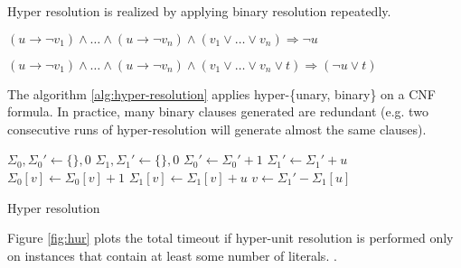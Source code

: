 \label{sec:hyper-binary-resolution}

Hyper resolution is realized by applying binary resolution repeatedly.


\begin{myprop}
  $(u \rightarrow \neg v_1) \land \ldots
  \land (u \rightarrow \neg v_n) \land (v_1 \lor \dots \lor v_n)
  \Rightarrow \neg u$
\end{myprop}

\begin{myprop}
  $(u \rightarrow \neg v_1) \land \ldots
  \land (u \rightarrow \neg v_n)
  \land (v_1 \lor \dots \lor v_n \lor t) \Rightarrow (\neg u \lor t)$
\end{myprop}

The algorithm \ref{alg:hyper-resolution} applies hyper-\{unary,
binary\} on a CNF formula. In practice, many binary clauses generated
are redundant (e.g. two consecutive runs of hyper-resolution will
generate almost the same clauses).

\begin{algorithm}[h]
  \begin{algorithmic}

    \STATE $\Sigma_0, \Sigma_0' \gets \{\}, 0$
    \STATE $\Sigma_1, \Sigma_1' \gets \{\}, 0$
        \STATE $\Sigma_0' \gets \Sigma_0' + 1$
        \STATE $\Sigma_1' \gets \Sigma_1' + u$
          \STATE $\Sigma_0[v] \gets \Sigma_0[v] + 1$
          \STATE $\Sigma_1[v] \gets \Sigma_1[v] + u$
        \ENDFOR
      \ENDFOR
          \STATE $v \gets \Sigma_1' - \Sigma_1[u]$
        \ENDIF
      \ENDFOR
    \ENDFOR
  \end{algorithmic}

  \caption{Hyper resolution}
  \label{alg:hyper-resolution}
\end{algorithm}

Figure \ref{fig:hur} plots the total timeout if hyper-unit resolution
is performed only on instances that contain at least some number
of literals. .

